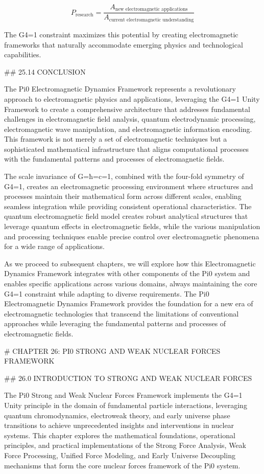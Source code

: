 $$ P_{\text{research}} = \frac{A_{\text{new electromagnetic applications}}}{A_{\text{current electromagnetic understanding}}} $$

The G4=1 constraint maximizes this potential by creating electromagnetic frameworks that naturally accommodate emerging physics and technological capabilities.

## 25.14 CONCLUSION

The Pi0 Electromagnetic Dynamics Framework represents a revolutionary approach to electromagnetic physics and applications, leveraging the G4=1 Unity Framework to create a comprehensive architecture that addresses fundamental challenges in electromagnetic field analysis, quantum electrodynamic processing, electromagnetic wave manipulation, and electromagnetic information encoding. This framework is not merely a set of electromagnetic techniques but a sophisticated mathematical infrastructure that aligns computational processes with the fundamental patterns and processes of electromagnetic fields.

The scale invariance of G=ħ=c=1, combined with the four-fold symmetry of G4=1, creates an electromagnetic processing environment where structures and processes maintain their mathematical form across different scales, enabling seamless integration while providing consistent operational characteristics. The quantum electromagnetic field model creates robust analytical structures that leverage quantum effects in electromagnetic fields, while the various manipulation and processing techniques enable precise control over electromagnetic phenomena for a wide range of applications.

As we proceed to subsequent chapters, we will explore how this Electromagnetic Dynamics Framework integrates with other components of the Pi0 system and enables specific applications across various domains, always maintaining the core G4=1 constraint while adapting to diverse requirements. The Pi0 Electromagnetic Dynamics Framework provides the foundation for a new era of electromagnetic technologies that transcend the limitations of conventional approaches while leveraging the fundamental patterns and processes of electromagnetic fields.

# CHAPTER 26: PI0 STRONG AND WEAK NUCLEAR FORCES FRAMEWORK

## 26.0 INTRODUCTION TO STRONG AND WEAK NUCLEAR FORCES

The Pi0 Strong and Weak Nuclear Forces Framework implements the G4=1 Unity principle in the domain of fundamental particle interactions, leveraging quantum chromodynamics, electroweak theory, and early universe phase transitions to achieve unprecedented insights and interventions in nuclear systems. This chapter explores the mathematical foundations, operational principles, and practical implementations of the Strong Force Analysis, Weak Force Processing, Unified Force Modeling, and Early Universe Decoupling mechanisms that form the core nuclear forces framework of the Pi0 system.

